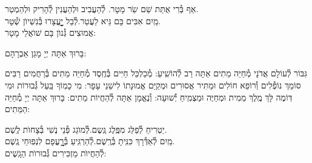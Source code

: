 \documentclass[twoside, openany, parskip=half, 11pt]{book}
\begin{document}


אַף בְּ֯רִי אֻתַּת שֵׁם שַֹר מָטָר. \hfill לְ֯הַעֲבִיב וּלְהַעֲנִין לְ֯הָרִיק וּלְהַמְטַר.\\
מַֽיִם אִבִּים בָּם גֵּיא לַעֲטַר.\hfill לְ֯בַל יׇׇׇׇׇׇׇעֳצָרוּ בְּ֯נִשְׁיוׂן שְׁ֯טָר.\\
אֲמוּצִים גְּ֯נוׂן בָּם שׁוׂאֲלֵי מָטָר:



בָּרוּךְ אַתָּה יְיָ מָגֵן אַבְרָהָם:

גִּבּוֹר לְ֯עוֹלָם אֲדֹנָי מְ֯חַיֵּה מֵתִים אַתָּה רַב לְ֯הוֹשִֽׁיעַ: מְ֯כַלְכֵּל חַיִּים בְּ֯חֶֽסֶד מְ֯חַיֵּה מֵתִים בְּ֯רַחֲמִים רַבִּים סוֹמֵךְ נוֹפְ֯לִים וְ֯רוֹפֵא חוֹלִים וּמַתִּיר אֲסוּרִים וּמְקַיֵּם אֱמוּנָתוֹ לִישֵׁנֵי עָפָר: מִי כָמֽוֹךָ בַּֽעַל גְּ֯בוּרוֹת וּמִי דּֽוֹמֶה לָּךְ מֶֽלֶךְ מֵמִית וּמְחַיֶּה וּמַצְמִֽיחַ יְ֯שׁוּעָה: וְ֯נֶאֱמָן אַתָּה לְ֯הַחֲיוֹת מֵתִים: בָּרוּךְ אַתָּה יְיָ מְ֯חַיֵּה הַמֵּתִים:





יַטְרִיחַ לְ֯פַלֵּג מִפֶּֽלֶג גֶּֽשֶם.\hfill לְ֯מוׂגֵג פְּ֯נֵי נֶשִׁי בְּ֯צָחוׂת לֶֽשֶׁם.\\
מַֽיִם לְ֯אַדְּ֯רָךְ כִּנִּֽיתָ בְּ֯רֶֽשֶׁם.\hfill לְ֯הַרְגִּֽיעַ בְּ֯רׇׇׇׇׇעֳפָם לִנְפֽוּחֵי גֶֽשֶׁם.\\
לְ֯הַחֲיוׂת מַזְכִּירִים גְּ֯בוּרוׂת הַגָֽשֶׁים:
\end{document}
